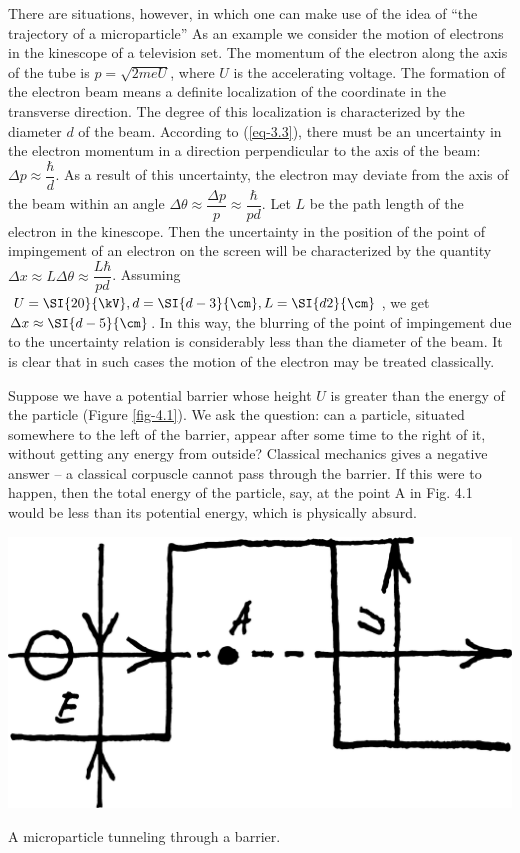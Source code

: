 \documentclass[a4paper,sfsidenotes,colorlinks=true]{tufte-book}
\numberwithin{equation}{section}
\numberwithin{figure}{section}
\begin{document}
There are situations, however, in which one can make use of the idea
of ``the trajectory of a microparticle'' As an example we consider the
motion of electrons in the kinescope of a television set. The momentum
of the electron along the axis of the tube is $p = \sqrt{2meU}$, where
$U$ is the accelerating voltage. The formation of the electron beam
means a definite localization of the coordinate in the transverse
direction. The degree of this localization is characterized by the
diameter $d$ of the beam. According to (\ref{eq-3.3}), there must be
an uncertainty in the electron momentum in a direction perpendicular
to the axis of the beam: $\Delta p \approx \dfrac{\hbar}{d}$. As a
result of this uncertainty, the electron may deviate from the axis of
the beam within an angle $\Delta \theta \approx \dfrac{\Delta p}{p}
\approx \dfrac{\hbar}{pd}$. Let $L$ be the path length of the electron
in the kinescope. Then the uncertainty in the position of the point of
impingement of an electron on the screen will be characterized by the
quantity $\Delta x \approx L \Delta \theta \approx \dfrac{L
  \hbar}{pd}$. Assuming $U = \SI{20}{\kV}, d = \SI{d-3}{\cm}, L =
\SI{d2}{\cm}$, we get $\Delta x \approx \SI{d-5}{\cm}$. In this way,
the blurring of the point of impingement due to the uncertainty
relation is considerably less than the diameter of the beam. It is
clear that in such cases the motion of the electron may be treated
classically.

  

Suppose we have a potential barrier whose height
$U$ is greater than the energy of the particle (Figure
\ref{fig-4.1}). We ask the question: can a particle, situated
somewhere to the left of the barrier, appear after some time to the
right of it, without getting any energy from outside? Classical
mechanics gives a negative answer -- a classical corpuscle cannot pass
through the barrier. If this were to happen, then the total energy of
the particle, say, at the point A in Fig. 4.1 would be less than its
potential energy, which is physically absurd.

\begin{marginfigure}%
\centering
\includegraphics[width=\linewidth]{figures/fig-04-01.pdf}
\caption{A microparticle tunneling through a barrier.}
\label{fig-4.1}
\end{marginfigure}
\end{document}
